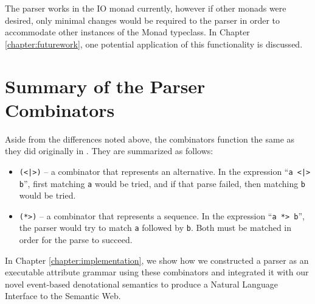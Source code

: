 \documentclass[../main.tex]{subfiles}
\begin{document}
The parser works in the IO monad currently, however if other monads were desired, only minimal changes would be required to the parser in order to accommodate
other instances of the Monad typeclass.  In Chapter \ref{chapter:futurework}, one potential application of this functionality is discussed.


\section{Summary of the Parser Combinators}

Aside from the differences noted above, the combinators function the same as they did originally in \cite{frosthafiz2008}.  They are summarized as follows:

\begin{itemize}
	\item \texttt{(<|>)} -- a combinator that represents an alternative.  In the expression ``\texttt{a <|> b}'', first matching \texttt{a} would be tried, and if that parse failed, then matching \texttt{b} would be tried.
	\item \texttt{(*>)} -- a combinator that represents a sequence.  In the expression ``\texttt{a *> b}'', the parser would try to match \texttt{a} followed by \texttt{b}.  Both must be matched in order for the parse to succeed.
\end{itemize}

In Chapter \ref{chapter:implementation}, we show how we constructed a parser as an executable attribute grammar using these combinators and integrated it with our novel event-based denotational semantics to produce a Natural Language Interface to the Semantic Web.
\end{document}
